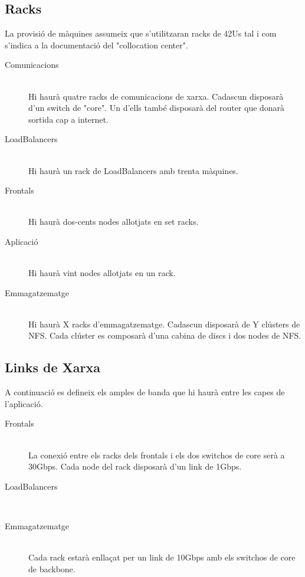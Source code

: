 \documentclass[a4paper, 11pt]{article}
\begin{document}
\subsection{Racks}

La provisió de màquines assumeix que s'utilitzaran racks de 42Us tal i com s'indica a la documentació del "collocation center".

\begin{description}

\item[Comunicacions] \hfill \\ 
    Hi haurà quatre racks de comunicacions de xarxa. Cadascun disposarà d'un switch de "core". Un d'ells també disposarà del router que donarà sortida cap a internet. 
    
\item[LoadBalancers] \hfill \\
    Hi haurà un rack de LoadBalancers amb trenta màquines.

\item[Frontals] \hfill \\
    Hi haurà dos-cents nodes allotjats en set racks.

\item[Aplicació] \hfill \\
    Hi haurà vint nodes allotjats en un rack. 
    
\item[Emmagatzematge] \hfill \\
    Hi haurà X racks d'emmagatzematge. Cadascun disposarà de Y clústers de NFS. Cada clúster es composarà d'una cabina de discs i dos nodes de NFS.

\end{description}

\subsection{Links de Xarxa}

A continuació es defineix els amples de banda que hi haurà entre les capes de l'aplicació. 

    \begin{description}
        \item[Frontals] \hfill \\
            La conexió entre els racks dels frontals i els dos switchos de core serà a 30Gbps. Cada node del rack disposarà d'un link de 1Gbps.
        
        \item[LoadBalancers] \hfill \\
        
        \item[Emmagatzematge] \hfill \\
            Cada rack estarà enllaçat per un link de 10Gbps amb els switchos de core de backbone.
            
    \end{description}
    
\end{document}
